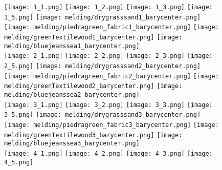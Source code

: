 \begin{figure}[ht!]
\vspace{-3mm}
{\centering
    \texttt{[image: 1\_1.png]}
    \texttt{[image: 1\_2.png]}
    \texttt{[image: 1\_3.png]}
    \texttt{[image: 1\_5.png]}
    \hspace{2mm}
    \texttt{[image: melding/drygrasssand1\_barycenter.png]}
    \texttt{[image: melding/piedragreen\_fabric1\_barycenter.png]}
    \texttt{[image: melding/greenTextilewood1\_barycenter.png]}
    \texttt{[image: melding/bluejeanssea1\_barycenter.png]}
 \\
\vspace{1mm}
    \texttt{[image: 2\_1.png]}
    \texttt{[image: 2\_2.png]}
    \texttt{[image: 2\_3.png]}
    \texttt{[image: 2\_5.png]}
    \hspace{2mm}
    \texttt{[image: melding/drygrasssand2\_barycenter.png]}
    \texttt{[image: melding/piedragreen\_fabric2\_barycenter.png]}
    \texttt{[image: melding/greenTextilewood2\_barycenter.png]}
    \texttt{[image: melding/bluejeanssea2\_barycenter.png]}
 \\
\vspace{1mm}
    \texttt{[image: 3\_1.png]}
    \texttt{[image: 3\_2.png]}
    \texttt{[image: 3\_3.png]}
    \texttt{[image: 3\_5.png]}
    \hspace{2mm}
    \texttt{[image: melding/drygrasssand3\_barycenter.png]}
    \texttt{[image: melding/piedragreen\_fabric3\_barycenter.png]}
    \texttt{[image: melding/greenTextilewood3\_barycenter.png]}
    \texttt{[image: melding/bluejeanssea3\_barycenter.png]}
 \\
\vspace{1mm}
    \texttt{[image: 4\_1.png]}
    \texttt{[image: 4\_2.png]}
    \texttt{[image: 4\_3.png]}
    \texttt{[image: 4\_5.png]}
}
\end{figure}
